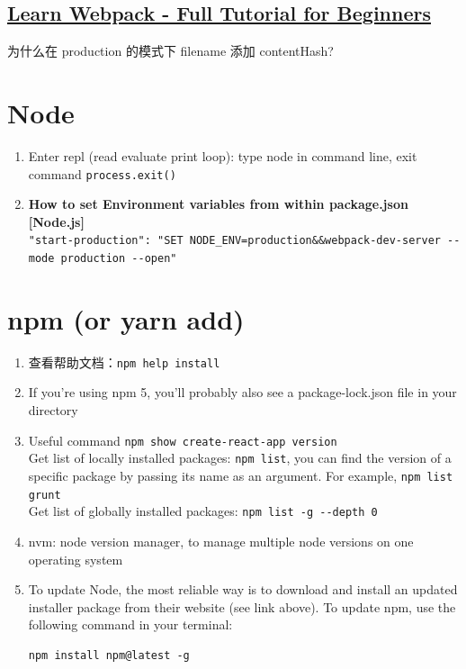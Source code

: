 \documentclass[a4paper, 12pt]{article}
\begin{document}
\subsection{\href{https://www.youtube.com/watch?v=MpGLUVbqoYQ}{Learn Webpack - Full Tutorial for Beginners}}
为什么在 production 的模式下 filename 添加 contentHash?


\section{Node}
\begin{enumerate}
\item Enter repl (read evaluate print loop): type node in command line, exit command \verb|process.exit()|
\item \textbf{How to set Environment variables from within package.json [Node.js]}\\
\verb|"start-production": "SET NODE_ENV=production&&webpack-dev-server --mode production --open"|
\end{enumerate}



\section{npm (or yarn add)}
\begin{enumerate}

\item 查看帮助文档：\verb|npm help install|

\item If you're using npm 5, you'll probably also see a package-lock.json file in your directory

\item Useful command \verb|npm show create-react-app version|\\
Get list of locally installed packages: \verb|npm list|, you can find the version of a specific package by passing its name as an argument. For example, \verb|npm list grunt|\\
Get list of globally installed packages: \verb|npm list -g --depth 0|

\item nvm: node version manager, to manage multiple node versions on one operating system

\item To update Node, the most reliable way is to download and install an updated installer package from their website (see link above). To update npm, use the following command in your terminal:
\begin{verbatim}
npm install npm@latest -g
\end{verbatim}
\end{enumerate}
\end{document}
